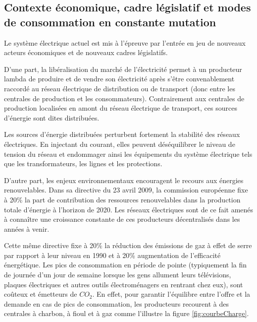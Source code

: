 \subsection{Contexte économique, cadre législatif et modes de con\-sommation en 
constante mutation}

Le système électrique actuel est mis à l'épreuve par l'entrée en jeu de nouveaux 
acteurs économiques et de nouveaux cadres législatifs. 

D'une part, la libéralisation du marché de l'électricité permet à un producteur 
lambda de produire et de vendre son électricité après s'être convenablement 
raccordé au réseau électrique de distribution ou de transport (donc entre les 
centrales de production et les consommateurs). Contrairement aux centrales de 
production localisées en amont du réseau électrique de transport, ces sources 
d'énergie sont dites distribuées. 

Les sources d'énergie distribuées perturbent fortement la stabilité des réseaux 
électriques. En injectant du courant, elles peuvent déséquilibrer le niveau de 
tension du réseau et endommager ainsi les équipements du système électrique tels 
que les transformateurs, les lignes et les protections. 

D'autre part, les enjeux environnementaux encouragent le recours aux énergies 
renouvelables. Dans sa directive du 23 avril 2009, la commission européenne fixe 
à 20\% la part de contribution des ressources renouvelables dans la production 
totale 
d'énergie à l'horizon de 2020. Les réseaux électriques sont 
de ce fait amenés à connaître une croissance constante de ces producteurs 
décentralisés dans les années à venir.

Cette même directive fixe à 20\% la réduction des émissions de gaz à effet de 
serre par rapport à leur niveau en 1990 et à 20\% augmentation de l'efficacité 
énergétique. Les pics de consommation en période de pointe (typiquement la fin 
de 
journée d'un jour de semaine lorsque les gens allument leurs 
télévisions, plaques électriques et autres outils électroménagers en rentrant 
chez eux), sont coûteux 
et émetteurs de $CO_{2}$. En effet, pour garantir l'équilibre entre l'offre et 
la demande en cas de pics de consommation, les producteurs recourent à des 
centrales à charbon, à fioul et à 
gaz comme l'illustre la figure \ref{fig:courbeCharge}.

